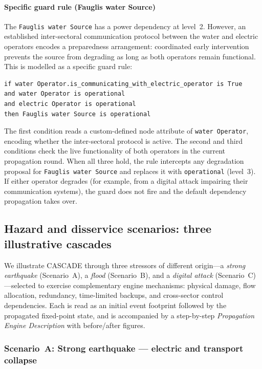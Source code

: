 \documentclass[review,12pt]{elsarticle}
\begin{document}
\paragraph{Specific guard rule (Fauglis water Source)}
The \texttt{Fauglis water Source} has a power dependency at level~2.
However, an established inter-sectoral communication protocol between the
water and electric operators encodes a preparedness arrangement: coordinated
early intervention prevents the source from degrading as long as both
operators remain functional.
This is modelled as a specific guard rule:
\begin{verbatim}
if water Operator.is_communicating_with_electric_operator is True
and water Operator is operational
and electric Operator is operational
then Fauglis water Source is operational
\end{verbatim}
The first condition reads a custom-defined node attribute of \texttt{water Operator}, encoding whether the inter-sectoral protocol is active. The second and third conditions check the live functionality of both operators in the current propagation round.
When all three hold, the rule intercepts any degradation proposal for
\texttt{Fauglis water Source} and replaces it with \texttt{operational}
(level~3). If either operator degrades (for example, from a digital attack impairing their communication systems), the guard does not fire and the default dependency propagation takes over.


\subsection{Hazard and disservice scenarios: three illustrative cascades}
\label{subsec:case_scenarios}

We illustrate CASCADE through three stressors of different origin---a
\emph{strong earthquake} (Scenario~A), a \emph{flood} (Scenario~B), and a \emph{digital attack} (Scenario~C)---selected to exercise complementary engine mechanisms: physical damage, flow allocation, redundancy, time-limited backups, and cross-sector control dependencies. Each is read as an initial event footprint
followed by the propagated fixed-point state, and is accompanied by a step-by-step \emph{Propagation Engine Description} with before/after figures.

\subsubsection{Scenario~A: Strong earthquake — electric and transport collapse}
\label{subsubsec:scenarioA}
\end{document}
